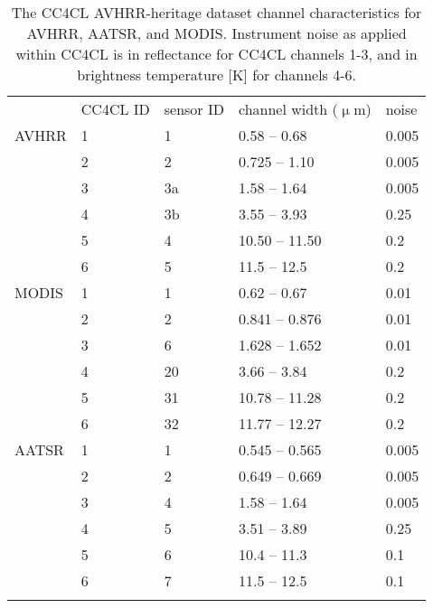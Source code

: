 \begin{table}[h]
  \caption{The CC4CL AVHRR-heritage dataset channel characteristics for AVHRR, AATSR, and MODIS. Instrument noise as applied within CC4CL is in reflectance for CC4CL channels 1-3, and in brightness temperature [K] for channels 4-6.}
  \begin{tabular}{l|p{0.7cm}p{0.7cm}p{1.8cm}p{0.5cm}}
    \tophline
    & CC4CL ID & sensor ID & channel width ($\upmu$m) & noise \\
    \middlehline
    AVHRR & 1 & 1 & 0.58 -- 0.68 & 0.005 \\
          & 2 & 2 & 0.725 -- 1.10 & 0.005 \\
          & 3 & 3a & 1.58 -- 1.64 & 0.005 \\
          & 4 & 3b & 3.55 -- 3.93 & 0.25 \\
          & 5 & 4 & 10.50 -- 11.50 & 0.2 \\
          & 6 & 5 & 11.5 -- 12.5 & 0.2 \\
    \middlehline
    MODIS & 1 & 1 & 0.62 -- 0.67 & 0.01 \\
          & 2 & 2 & 0.841 -- 0.876 & 0.01 \\
          & 3 & 6 & 1.628 -- 1.652 & 0.01 \\
          & 4 & 20 & 3.66 -- 3.84 & 0.2 \\
          & 5 & 31 & 10.78 -- 11.28 & 0.2 \\
          & 6 & 32 & 11.77 -- 12.27 & 0.2 \\
    \middlehline
    AATSR & 1 & 1 & 0.545 -- 0.565 & 0.005 \\
          & 2 & 2 & 0.649 -- 0.669 & 0.005 \\
          & 3 & 4 & 1.58 -- 1.64 & 0.005 \\
          & 4 & 5 & 3.51 -- 3.89 & 0.25 \\
          & 5 & 6 & 10.4 -- 11.3 & 0.1 \\
          & 6 & 7 & 11.5 -- 12.5 & 0.1 \\
    \bottomhline
  \end{tabular}
  \label{tab:channels}
\end{table}

\clearpage


